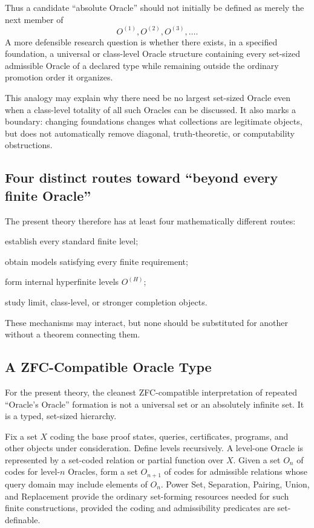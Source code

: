 \documentclass[11pt]{article}
\begin{document}
Thus a candidate ``absolute Oracle'' should not initially be defined as merely the next member of
\[
O^{(1)},O^{(2)},O^{(3)},\ldots.
\]
A more defensible research question is whether there exists, in a specified foundation, a universal or class-level Oracle structure containing every set-sized admissible Oracle of a declared type while remaining outside the ordinary promotion order it organizes.

This analogy may explain why there need be no largest set-sized Oracle even when a class-level totality of all such Oracles can be discussed. It also marks a boundary: changing foundations changes what collections are legitimate objects, but does not automatically remove diagonal, truth-theoretic, or computability obstructions.

\subsection{Four distinct routes toward ``beyond every finite Oracle''}
The present theory therefore has at least four mathematically different routes:
\begin{description}[style=nextline,leftmargin=2.3cm]
\item[Induction] establish every standard finite level;
\item[Compactness] obtain models satisfying every finite requirement;
\item[Nonstandard analysis] form internal hyperfinite levels $O^{(H)}$;
\item[Transfinite/large-totality foundations] study limit, class-level, or stronger completion objects.
\end{description}
These mechanisms may interact, but none should be substituted for another without a theorem connecting them.

\subsection{A ZFC-Compatible Oracle Type}
For the present theory, the cleanest ZFC-compatible interpretation of repeated ``Oracle's Oracle'' formation is not a universal set or an absolutely infinite set. It is a typed, set-sized hierarchy.

Fix a set $X$ coding the base proof states, queries, certificates, programs, and other objects under consideration. Define levels recursively. A level-one Oracle is represented by a set-coded relation or partial function over $X$. Given a set $O_n$ of codes for level-$n$ Oracles, form a set $O_{n+1}$ of codes for admissible relations whose query domain may include elements of $O_n$. Power Set, Separation, Pairing, Union, and Replacement provide the ordinary set-forming resources needed for such finite constructions, provided the coding and admissibility predicates are set-definable.
\end{document}
